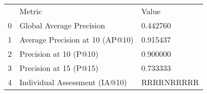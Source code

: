 \begin{tabular}{lll}
 & Metric & Value \\
0 & Global Average Precision & 0.442760 \\
1 & Average Precision at 10 (AP@10) & 0.915437 \\
2 & Precision at 10 (P@10) & 0.900000 \\
3 & Precision at 15 (P@15) & 0.733333 \\
4 & Individual Assessment (IA@10) & RRRRNRRRRR \\
\end{tabular}
